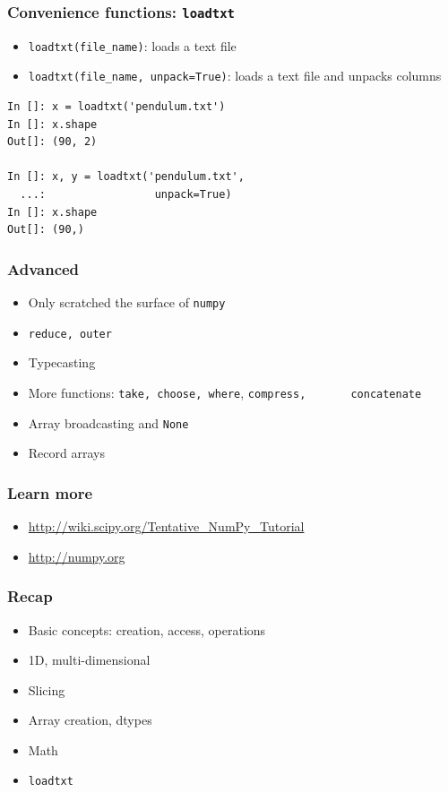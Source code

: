 \documentclass[14pt,compress]{beamer}
\newcounter{time}
\newcommand{\inctime}[1]{\addtocounter{time}{#1}{\tiny \thetime\ m}}
\newcommand{\typ}[1]{\lstinline{#1}}
\newcommand{\num}{\texttt{numpy}}
\begin{document}
\begin{frame}[fragile]
    \frametitle{Convenience functions: \typ{loadtxt}}
  \begin{itemize}
      \item \typ{loadtxt(file_name)}: loads a text file
      \item \typ{loadtxt(file_name, unpack=True)}: loads a text file and
          unpacks columns
  \end{itemize}
  \begin{lstlisting}
In []: x = loadtxt('pendulum.txt')
In []: x.shape
Out[]: (90, 2)

In []: x, y = loadtxt('pendulum.txt',
  ...:                 unpack=True)
In []: x.shape
Out[]: (90,)
  \end{lstlisting}

  \inctime{20}
\end{frame}


\begin{frame}[fragile]
  \frametitle{Advanced}
  \begin{itemize}
  \item Only scratched the surface of \num
  \item \typ{reduce, outer}
  \item Typecasting
  \item More functions: \typ{take, choose, where}, \typ{compress,
      concatenate}
  \item Array broadcasting and \typ{None}
  \item Record arrays
  \end{itemize}
\end{frame}

\begin{frame}[fragile]
  \frametitle{Learn more}
    \begin{itemize}
        \item \url{http://wiki.scipy.org/Tentative_NumPy_Tutorial}
        \item \url{http://numpy.org}
    \end{itemize}
\end{frame}

\begin{frame}[fragile]
  \frametitle{Recap}
  \begin{itemize}
      \item Basic concepts: creation, access, operations
      \item 1D, multi-dimensional
      \item Slicing
      \item Array creation, dtypes
      \item Math
      \item \typ{loadtxt}
  \end{itemize}
\end{frame}
\end{document}
